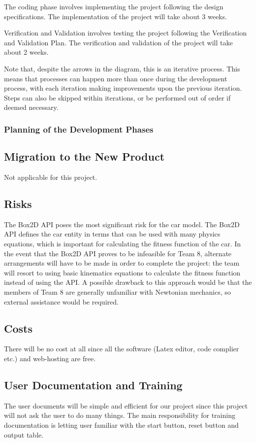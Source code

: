 \documentclass[12pt, titlepage]{article}
\begin{document}
The coding phase involves implementing the project following the design 
specifications. The implementation of the project will take about 3 weeks.

Verification and Validation involves testing the project following the 
Verification and Validation Plan. The verification and validation of the project 
will take about 2 weeks.

Note that, despite the arrows in the diagram, this is an iterative process. This 
means that processes can happen more than once during the development process, 
with each iteration making improvements upon the previous iteration. Steps can 
also be skipped within iterations, or be performed out of order if deemed 
necessary. 

\subsubsection{Planning of the Development Phases}

\subsection{Migration to the New Product}
Not applicable for this project.

\subsection{Risks}
The Box2D API poses the most signiﬁcant risk for the car model. The Box2D 
API deﬁnes the car entity in terms that can be used with many physics 
equations, which is important for calculating the ﬁtness function of the 
car. In the event that the Box2D API proves to be infeasible for Team 8, 
alternate arrangements will have to be made in order to complete the
project: the team will resort to using basic kinematics equations to calculate 
the ﬁtness function instead of using the API. A possible drawback to this 
approach would be that the members of Team 8 are generally unfamiliar with 
Newtonian mechanics, so external assistance would be required. 

\subsection{Costs}
There will be no cost at all since all the software (Latex editor, code 
complier etc.) and web-hosting are free. 

\subsection{User Documentation and Training}
The user documents will be simple and efficient for our project since this 
project will not ask the user to do many things. The main responsibility for 
training documentation is letting user familiar with the start button, reset 
button and output table.
\end{document}
